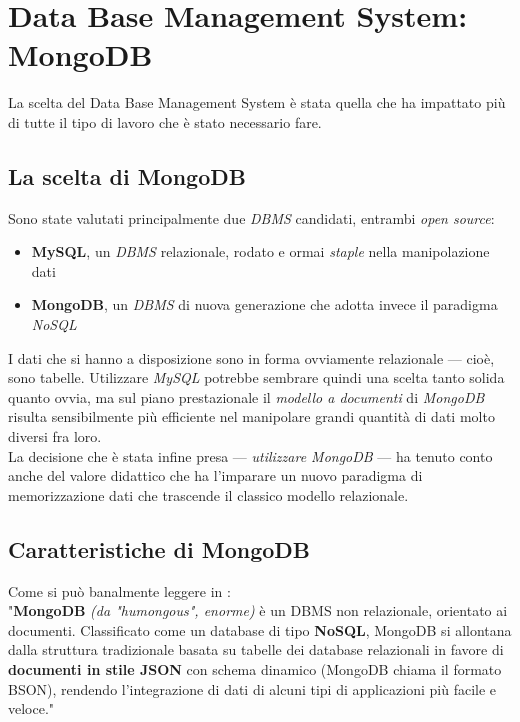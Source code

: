\section{Data Base Management System: MongoDB}

    La scelta del Data Base Management System è stata quella che ha impattato più di tutte il tipo di lavoro che è stato necessario fare.

    \subsection{La scelta di MongoDB}
    
        Sono state valutati principalmente due \textit{DBMS} candidati, entrambi \textit{open source}:

        \begin{itemize}
            \item \textbf{MySQL}, un \textit{DBMS} relazionale, rodato e ormai \textit{staple} nella manipolazione dati
            \item \textbf{MongoDB}, un \textit{DBMS} di nuova generazione che adotta invece il paradigma \textit{NoSQL} 
        \end{itemize}

        I dati che si hanno a disposizione sono in forma ovviamente relazionale --- cioè, sono tabelle. Utilizzare \textit{MySQL} potrebbe sembrare quindi una scelta tanto solida quanto ovvia, ma sul piano prestazionale il \textit{modello a documenti} di \textit{MongoDB} risulta sensibilmente più efficiente nel manipolare grandi quantità di dati molto diversi fra loro. \\

        La decisione che è stata infine presa --- \textit{utilizzare MongoDB} --- ha tenuto conto anche del valore didattico che ha l'imparare un nuovo paradigma di memorizzazione dati che trascende il classico modello relazionale.

    \subsection{Caratteristiche di MongoDB}

        Come si può banalmente leggere in \cite{mongowiki}: \\
        
        "\textbf{MongoDB} \textit{(da "humongous", enorme)} è un DBMS non relazionale, orientato ai documenti. Classificato come un database di tipo \textbf{NoSQL}, MongoDB si allontana dalla struttura tradizionale basata su tabelle dei database relazionali in favore di \textbf{documenti in stile JSON} con schema dinamico (MongoDB chiama il formato BSON), rendendo l'integrazione di dati di alcuni tipi di applicazioni più facile e veloce." \\

